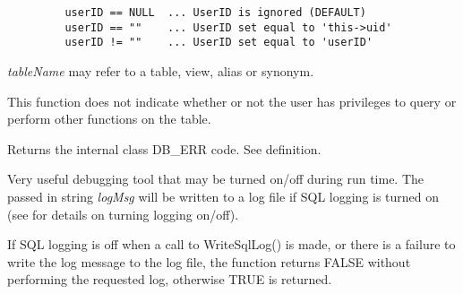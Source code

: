 \begin{verbatim}
         userID == NULL  ... UserID is ignored (DEFAULT)
         userID == ""    ... UserID set equal to 'this->uid'
         userID != ""    ... UserID set equal to 'userID'
\end{verbatim}


{\it tableName} may refer to a table, view, alias or synonym.

This function does not indicate whether or not the user has privileges to query or perform other functions on the table.

\label{wxdbtranslatesqlstate}





Returns the internal class DB_ERR code.  See  definition.

\label{wxdbwritesqllog}





Very useful debugging tool that may be turned on/off during run time.  The
passed in string {\it logMsg} will be written to a log file if SQL logging
is turned on (see  for details on turning logging on/off).


If SQL logging is off when a call to WriteSqlLog() is made, or there is a
failure to write the log message to the log file, the function returns
FALSE without performing the requested log, otherwise TRUE is returned.



